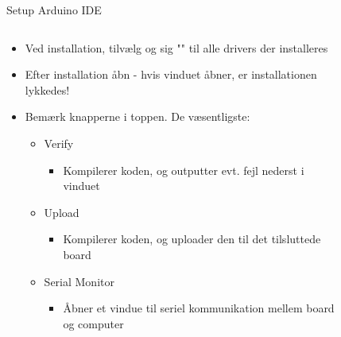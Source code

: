 \documentclass[aspectratio=169]{beamer}
\begin{document}
\begin{frame}{Setup Arduino IDE}
\begin{columns}
	\begin{column}{0.5\textwidth}
		\begin{textBox}
			\begin{itemize}
				\item Ved installation, tilvælg og sig "" til alle drivers der installeres
				\item Efter installation åbn  - hvis vinduet åbner, er installationen lykkedes!
				\item Bemærk knapperne i toppen. De væsentligste:
				\begin{itemize}
					\item  Verify
					\begin{itemize}
						\item Kompilerer koden, og outputter evt. fejl nederst i vinduet
					\end{itemize}
					\item  Upload
					\begin{itemize}
						\item Kompilerer koden, og uploader den til det tilsluttede board
					\end{itemize}
					\item  Serial Monitor
					\begin{itemize}
						\item Åbner et vindue til seriel kommunikation mellem board og computer
					\end{itemize}
				\end{itemize}
			\end{itemize}
		\end{textBox}
	\end{column}
	\begin{column}{0.5\textwidth}
		\begin{figure}

\end{figure}
\end{column}
\end{columns}
\end{frame}
\end{document}
